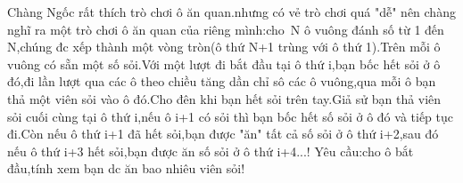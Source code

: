 Chàng Ngốc rất thích trò chơi ô ăn quan.nhưng có vẻ trò chơi quá "dễ" nên chàng nghĩ ra một trò chơi ô ăn quan của riêng mình:cho N ô vuông đánh số từ 1 đến N,chúng đc xếp thành một vòng tròn(ô thứ N+1 trùng với ô thứ 1).Trên mỗi ô vuông có sẵn một số sỏi.Với một lượt đi bắt đầu tại ô thứ i,bạn bốc hết sỏi ở ô đó,đi lần lượt qua các ô theo chiều tăng dần chỉ sô các ô vuông,qua mỗi ô bạn thả một viên sỏi vào ô đó.Cho đên khi bạn hết sỏi trên tay.Giả sử bạn thả viên sỏi cuối cùng tại ô thứ i,nếu ô i+1 có sỏi thì bạn bốc hết số sỏi ở ô đó và tiếp tục đi.Còn nếu ô thứ i+1 đã hết sỏi,bạn được "ăn" tất cả số sỏi ở ô thứ i+2,sau đó nếu ô thứ i+3 hết sỏi,bạn được ăn số sỏi ở ô thứ i+4...! Yêu cầu:cho ô bắt đầu,tính xem bạn dc ăn bao nhiêu viên sỏi!